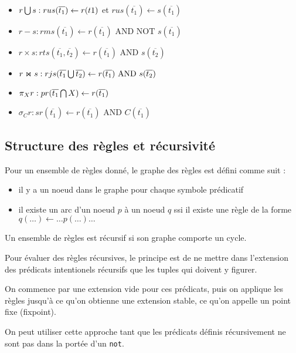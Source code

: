 		\begin{itemize}
		\item $r \bigcup s : rus(\overline{t_1}) \leftarrow r(t1)$ et $rus(\overline{t_1}) \leftarrow s(\overline{t_1})$
		\item $r - s : rms(\overline{t_1}) \leftarrow r(\overline{t_1}) \text{ AND NOT } s(\overline{t_1})$
		\item $r \times s : rts(\overline{t_1}, \overline{t_2}) \leftarrow r(\overline{t_1}) \text{ AND } s(\overline{t_2})$
		\item $r \Join s : rjs(\overline{t_1} \bigcup \overline{t_2}) \leftarrow r(\overline{t_1}) \text{ AND } s(\overline{t_2})$
		\item $\pi_Xr : pr(\overline{t_1} \bigcap X) \leftarrow r(\overline{t_1})$
		\item $\sigma_Cr : sr(\overline{t_1}) \leftarrow r(\overline{t_1}) \text{ AND } C(\overline{t_1})$
		\end{itemize}
		
		\subsection{Structure des règles et récursivité}
		
		Pour un ensemble de règles donné, le graphe des règles est défini comme suit :
		
		\begin{itemize}
			\item il y a un noeud dans le graphe pour chaque symbole prédicatif
			\item il existe un arc d'un noeud $p$ à un noeud $q$ ssi il existe une règle de la forme $q(\dots) \leftarrow \dots p (\dots ) \dots$
		\end{itemize}
		
		Un ensemble de règles est récursif si son graphe comporte un cycle.
		
		
		Pour évaluer des règles récursives, le principe est de ne mettre dans l'extension des prédicats intentionels récursifs que les tuples qui doivent y figurer.
		
		On commence par une extension vide pour ces prédicats, puis on applique les règles jusqu'à ce qu'on obtienne une extension stable, ce qu'on appelle un point fixe (fixpoint).
		
		On peut utiliser cette approche tant que les prédicats définis récursivement ne sont pas dans la portée d'un \texttt{not}.
		
